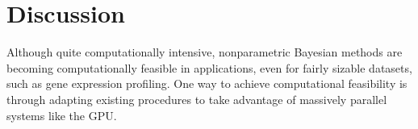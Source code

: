 {%
% 
% 

\section{Discussion}
\label{sec:discussion}
Although quite computationally intensive, nonparametric Bayesian methods are becoming computationally feasible in applications, even for fairly sizable datasets, such as gene expression profiling. One way to achieve computational feasibility is through adapting existing procedures to take advantage of massively parallel systems like the GPU.

}
